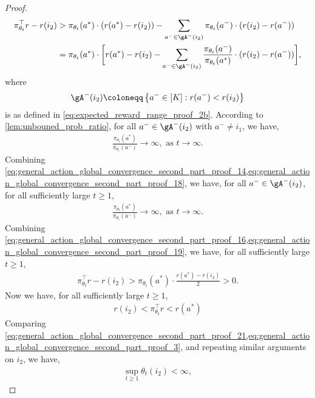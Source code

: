 \begin{proof}
\begin{align}
    \pi_{\theta_t}^\top r - r(i_2) &> \pi_{\theta_t}(a^*) \cdot (r(a^*) - r(i_2) ) - \sum_{a^- \in \gA^-(i_2)}{ \pi_{\theta_t}(a^-) \cdot ( r(i_2) - r(a^-)) } \\
    &= \pi_{\theta_t}(a^*) \cdot \bigg[ r(a^*) - r(i_2) - \sum_{a^- \in \gA^-(i_2)}{ \frac{ \pi_{\theta_t}(a^-)}{ \pi_{\theta_t}(a^*) } \cdot ( r(i_2) - r(a^-)) } \bigg],
\end{align}
where
\begin{align}
\label{eq:general_action_global_convergence_second_part_proof_17}
    \gA^-(i_2) \coloneqq \left\{ a^- \in [K]: r(a^-) < r(i_2) \right\}
\end{align}
is as defined in \cref{eq:expected_reward_range_proof_2b}. According to \cref{lem:unbouned_prob_ratio}, for all $a^- \in \gA^-(i_2)$ with $a^- \ne i_1$, we have, 
\begin{align}
\label{eq:general_action_global_convergence_second_part_proof_18}
    \frac{ \pi_{\theta_t}(a^*) }{ \pi_{\theta_t}(a^-)} \to \infty, \text{ as } t \to \infty.
\end{align}
Combining \cref{eq:general_action_global_convergence_second_part_proof_14,eq:general_action_global_convergence_second_part_proof_18}, we have, for all $a^- \in \gA^-(i_2)$, for all sufficiently large $t \ge 1$,
\begin{align}
\label{eq:general_action_global_convergence_second_part_proof_19}
    \frac{ \pi_{\theta_t}(a^*) }{ \pi_{\theta_t}(a^-)} \to \infty, \text{ as } t \to \infty.
\end{align}
Combining \cref{eq:general_action_global_convergence_second_part_proof_16,eq:general_action_global_convergence_second_part_proof_19}, we have, for all sufficiently large $t \ge 1$,
\begin{align}
\label{eq:general_action_global_convergence_second_part_proof_20}
    \pi_{\theta_t}^\top r - r(i_2) > \pi_{\theta_t}(a^*) \cdot \frac{ r(a^*) - r(i_2)}{2} > 0.
\end{align}
Now we have, for all sufficiently large $t \ge 1$,
\begin{align}
\label{eq:general_action_global_convergence_second_part_proof_21}
    r(i_2) < \pi_{\theta_t}^\top r < r(a^*)
\end{align}
Comparing \cref{eq:general_action_global_convergence_second_part_proof_21,eq:general_action_global_convergence_second_part_proof_3}, and repeating similar arguments on $i_2$, we have,
\begin{align}
\label{eq:general_action_global_convergence_second_part_proof_22}
    \sup_{t \ge 1}{ \theta_t(i_2) } < \infty,

\end{align}
\end{proof}
